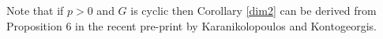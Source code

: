 \begin{rem}
  Note that if $p>0$ and $G$ is cyclic then Corollary \ref{dim2} can be derived from Proposition $6$ in the recent pre-print
 \cite{kako} by Karanikolopoulos and Kontogeorgis.
\end{rem}

\begin{comment}
We also consider an alternative approach to computing the fixed dimension of $H^0(X,\Omega_X^{\otimes m})$, relying on \citep[Thm 4.5]{galoisstruc}.
For the rest of this section we assume that $n$ is co-prime to $p$, that $g_X\geq 2$ and that $g_Y=0$.

We now introduce some notation from \cite{galoisstruc}.
We first denote by $\chi_P$ the representation of the decomposition group $G_P$ on the cotangent space $\mathfrak{m}_P/\mathfrak{m}_P^2$.
We also introduce the unique projective module $N_{G,X}$ satisfying
\begin{equation*}
 \bigoplus^n N_{G,X} = \bigoplus_{P\in X} \bigoplus_{d=1}^{e^t_p-1} \bigoplus^d {\rm Ind}_{G_P}^G(\chi_P^d),
\end{equation*}

where $e^t_p$ denotes the (tame) ramification index at a point $P\in X$, as in \citep[Thm 4.3]{galoisstruc}.

Fix an integer $m\geq 2$. Now if we write $mK_X = \sum_{P\in X} n_P[P]$ then we can define $r_P\in \{0,\ldots, e^t_p - 1\}$ and $s_P\in \ZZ$ to be the unique values such that
\[
 n_P = r_P + s_Pe_P^t.
\]

Finally, if for any $Q\in Y$ we let $\bar Q \in X$ be an element of the fibre with respect to $\pi$, we can state \citep[Thm 4.5]{galoisstruc}, which says that we have the following equality in $K_0(k[G])$:
\begin{equation}\label{eq}
 \chi(G,X,\Omega^{\otimes m}) = -[N_{G,X}] +\sum_{Q\in Y}\sum^{r_{\bar Q}}_{d=1} [{\rm Ind}_{G_{\bar Q}}^G(\chi_{\bar Q}^d)]  + \left( 1 + \sum_{Q\in Y} s_{\bar Q} \right) [k[G]],
\end{equation}
where for any $k[G]$ module $A$ then $[A]$ denotes that class of $A$ in $K_0[k[G]]$.

We wish to find when the action of $G$ on $H^0(X,\Omega^{\otimes m})$ is trivial.
Note that $[H^0(X,\Omega^{\otimes m})]$ is in the same class as $\chi(G,X,\Omega^{\otimes m})$ in $K_0(k[G])$, since $mK_X$ is non-special under our assumptions.
Hence the action will be trivial precisely when we have equality between the dimension and the fixed dimension.
We will work out the dimension and fixed dimension of each of the components of the above sum separately, before combining them to give a complete answer.



\end{comment}
